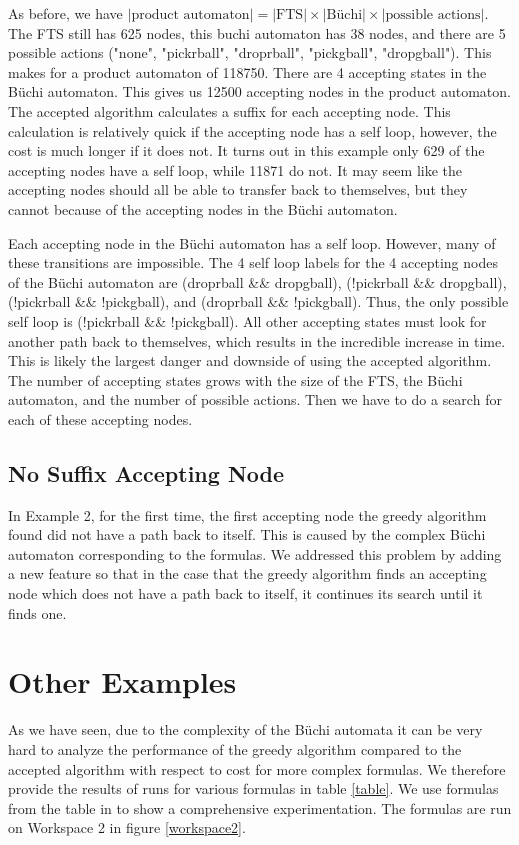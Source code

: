 As before, we have $|\text{product automaton}| =|\text{FTS}| \times |\text{B\"uchi}| \times |\text{possible actions}|$. The FTS still has 625 nodes, this buchi automaton has 38 nodes, and there are 5 possible actions ("none", "pickrball", "droprball", "pickgball", "dropgball"). This makes for a product automaton of 118750. There are 4 accepting states in the B\"uchi automaton. This gives us 12500 accepting nodes in the product automaton. The accepted algorithm calculates a suffix for each accepting node. This calculation is relatively quick if the accepting node has a self loop, however, the cost is much longer if it does not. It turns out in this example only 629 of the accepting nodes have a self loop, while 11871 do not. It may seem like the accepting nodes should all be able to transfer back to themselves, but they cannot because of the accepting nodes in the B\"uchi automaton. 

Each accepting node in the B\"uchi automaton has a self loop. However, many of these transitions are impossible. The 4 self loop labels for the 4 accepting nodes of the B\"uchi automaton are (droprball \&\& dropgball), (!pickrball \&\& dropgball), (!pickrball \&\& !pickgball), and (droprball \&\& !pickgball). Thus, the only possible self loop is (!pickrball \&\& !pickgball). All other accepting states must look for another path back to themselves, which results in the incredible increase in time. This is likely the largest danger and downside of using the accepted algorithm. The number of accepting states grows with the size of the FTS, the B\"uchi automaton, and the number of possible actions. Then we have to do a search for each of these accepting nodes.  

\subsection{No Suffix Accepting Node}
In Example 2, for the first time, the first accepting node the greedy algorithm found did not have a path back to itself. This is caused by the complex B\"uchi automaton corresponding to the formulas. We addressed this problem by adding a new feature so that in the case that the greedy algorithm finds an accepting node which does not have a path back to itself, it continues its search until it finds one. 

\section{Other Examples}
As we have seen, due to the complexity of the B\"uchi automata it can be very hard to analyze the performance of the greedy algorithm compared to the accepted algorithm with respect to cost for more complex formulas. We therefore provide the results of runs for various formulas in table \ref{table}. We use formulas from the table in \cite{somenzi00} to show a comprehensive experimentation. The formulas are run on Workspace 2 in figure \ref{workspace2}. 

